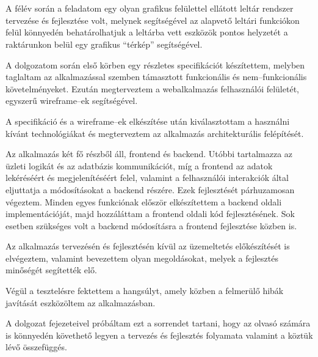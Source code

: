 \chapter{\bevezetes}
A félév során a feladatom egy olyan grafikus felülettel ellátott leltár rendszer tervezése és fejlesztése volt, melynek segítségével az alapvető leltári funkciókon felül könnyedén behatárolhatjuk a leltárba vett eszközök pontos helyzetét a raktárunkon belül egy grafikus “térkép” segítségével.

A dolgozatom során első körben egy részletes specifikációt készítettem, melyben taglaltam az alkalmazással szemben támasztott funkcionális és nem–funkcionális követelményeket.
Ezután megterveztem a webalkalmazás felhasználói felületét, egyszerű wireframe–ek segítségével.

A specifikáció és a wireframe–ek elkészítése után kiválasztottam a használni kívánt technológiákat és megterveztem az alkalmazás architekturális felépítését.

Az alkalmazás két fő részből áll, frontend és backend. Utóbbi tartalmazza az üzleti logikát és az adatbázis kommunikációt, míg a frontend az adatok lekéréséért és megjelenítéséért felel, valamint a felhasználói interakciók által eljuttatja a módosításokat a backend részére.
Ezek fejlesztését párhuzamosan végeztem. Minden egyes funkciónak először elkészítettem a backend oldali implementációját, majd hozzáláttam a frontend oldali kód fejlesztésének. Sok esetben szükséges volt a backend módosításra a frontend fejlesztése közben is.

Az alkalmazás tervezésén és fejlesztésén kívül az üzemeltetés előkészítését is elvégeztem, valamint bevezettem olyan megoldásokat, melyek a fejlesztés minőségét segítették elő.

Végül a tesztelésre fektettem a hangsúlyt, amely közben a felmerülő hibák javítását eszközöltem az alkalmazásban.

A dolgozat fejezeteivel próbáltam ezt a sorrendet tartani, hogy az olvasó számára is könnyedén követhető legyen a tervezés és fejlesztés folyamata valamint a köztük lévő összefüggés.